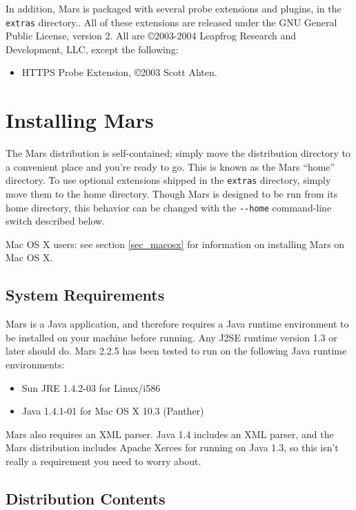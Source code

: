 \documentclass{article}
\newcommand{\filename}[1]{{\tt #1}}
\newcommand{\identifier}[1]{{\tt #1}}
\begin{document}
In addition, Mars is packaged with several probe extensions and
plugins, in the \filename{extras} directory.. All of these extensions
are released under the GNU General Public License, version 2. All are
\copyright 2003-2004 Leapfrog Research and Development, LLC, except
the following:

\begin{itemize}
\item HTTPS Probe Extension, \copyright 2003 Scott Ahten.
\end{itemize}

\section{Installing Mars}

The Mars distribution is self-contained; simply move the distribution
directory to a convenient place and you're ready to go. This is known
as the Mars ``home'' directory. To use optional extensions shipped in
the \filename{extras} directory, simply move them to the home
directory. Though Mars is designed to be run from its home directory,
this behavior can be changed with the
\identifier{\mbox{-}\mbox{-}home} command-line switch described below.

Mac OS X users: see section \ref{sec_macosx} for information on
installing Mars on Mac OS X.

\subsection{System Requirements}

Mars is a Java application, and therefore requires a Java runtime
environment to be installed on your machine before running. Any J2SE
runtime version 1.3 or later should do. Mars 2.2.5 has been tested to
run on the following Java runtime environments:

\begin{itemize}
\item Sun JRE 1.4.2-03 for Linux/i586
\item Java 1.4.1-01 for Mac OS X 10.3 (Panther)
\end{itemize}

Mars also requires an XML parser. Java 1.4 includes an XML parser, and
the Mars distribution includes Apache Xerces for running on Java 1.3,
so this isn't really a requirement you need to worry about.

\subsection{Distribution Contents}
\end{document}
